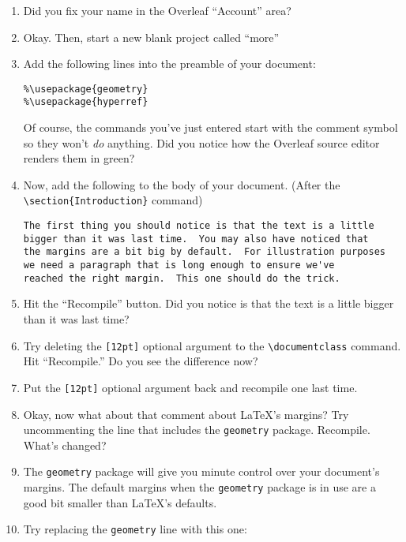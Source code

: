\begin{enumerate}
	\item Did you fix your name in the Overleaf ``Account'' area?
	\item Okay. Then, start a new blank project called ``more''
	\item Add the following lines into the preamble of your document:
\medskip

\begin{codeblock}
\begin{verbatim}
%\usepackage{geometry}
%\usepackage{hyperref}
\end{verbatim}
\end{codeblock}

Of course, the commands you've just entered start with the comment symbol so they won't {\em do} anything.  Did you notice how the Overleaf source editor renders them in green?

	\item Now, add the following to the body of your document.  (After the \verb+\section{Introduction}+ command)
\medskip

\begin{codeblock}
\begin{verbatim}
The first thing you should notice is that the text is a little
bigger than it was last time.  You may also have noticed that 
the margins are a bit big by default.  For illustration purposes 
we need a paragraph that is long enough to ensure we've 
reached the right margin.  This one should do the trick.
\end{verbatim}
\end{codeblock}
\medskip

	\item Hit the ``Recompile'' button.  Did you notice is that the text is a little bigger than it was last time?
	\item Try deleting the \verb+[12pt]+ optional argument to the \verb+\documentclass+ command.  Hit ``Recompile.'' Do you see the difference now?  
	\item Put the \verb+[12pt]+ optional argument back and recompile one last time.
	\item Okay, now what about that comment about \LaTeX{}'s margins?  Try uncommenting the line that includes the {\tt geometry} package.
	Recompile.  What's changed?
	\item The {\tt geometry} package will give you minute control over your document's margins.  The default margins when the {\tt geometry} package is in use are a good bit smaller than \LaTeX{}'s defaults.
	\item Try replacing the {\tt geometry} line with this one:
\medskip


\end{enumerate}
